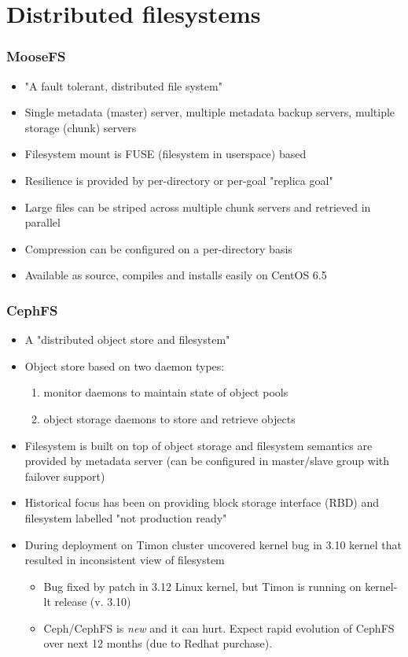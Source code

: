 \documentclass[handout]{beamer}
\begin{document}
\section{Distributed filesystems}
\begin{frame}
\frametitle{MooseFS}
\begin{itemize}
\item "A fault tolerant, distributed file system"
\item Single metadata (master) server, multiple metadata backup servers, multiple storage (chunk) servers
\item Filesystem mount is FUSE (filesystem in userspace) based
\pause
\item Resilience is provided by per-directory or per-goal "replica goal"
\item Large files can be striped across multiple chunk servers and retrieved in parallel
\item Compression can be configured on a per-directory basis
\item Available as source, compiles and installs easily on CentOS 6.5
\end{itemize}
\end{frame}

\begin{frame}
\frametitle{CephFS}
\begin{itemize}
\item A "distributed object store and filesystem"
\item Object store based on two daemon types:
\begin{enumerate}
\item monitor daemons to maintain state of object pools
\item object storage daemons to store and retrieve objects
\end{enumerate}
\item Filesystem is built on top of object storage and filesystem semantics are provided by metadata server (can be configured in master/slave group with failover support)
\pause
\item Historical focus has been on providing block storage interface (RBD) and filesystem labelled "not production ready"
\item During deployment on Timon cluster uncovered kernel bug in 3.10 kernel that resulted in inconsistent view of filesystem
\begin{itemize}
\item Bug fixed by patch in 3.12 Linux kernel, but Timon is running on kernel-lt release (v. 3.10)
\item Ceph/CephFS is \emph{new} and it can hurt. Expect rapid evolution of CephFS over next 12 months (due to Redhat purchase).
\end{itemize}
\end{itemize}
\end{frame}
\end{document}

